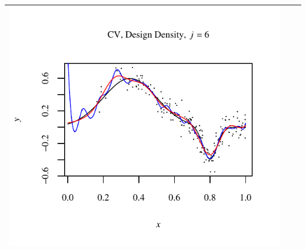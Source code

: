 \documentclass[11pt]{article}
\begin{document}
\begin{table}[h!]
\begin{center}
\begin{tabular}{| >{\centering\arraybackslash}m{2.1in} |  >{\centering\arraybackslash}m{2.1in} |  >{\centering\arraybackslash}m{2.1in}|}
      \includegraphics[width=1\linewidth,height=0.18\textheight]{Graphs/1/2/assignment5_a_1_2_6}\\\hline
    \end{tabular}
  \end{center}
\end{table}
\end{document}
